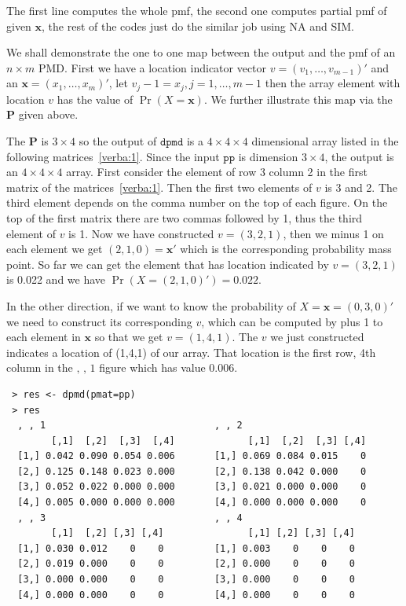 \documentclass[12pt]{article}
\newcommand{\Pmat}{\mathbf{P}}
\newcommand{\PMD}{\textrm{PMD}}
\newcommand{\xvec}{\boldsymbol{x}}
\newcommand{\code}{\texttt}
\newcommand{\SIM}{{\textrm{SIM}}}
\newcommand{\NA}{{\textrm{NA}}}
\begin{document}
The first line computes the whole pmf, the second one computes partial pmf of given $\xvec$, the rest of the codes just do the similar job using $\NA$ and $\SIM$.

We shall demonstrate the one to one map between the output and the pmf of an $n \times m$ $\PMD$. First we have a location indicator vector $v = (v_1, \dots, v_{m-1})'$ and an $\xvec=(x_1,\dots,x_m)'$, let $v_j-1 = x_j, j =1,\dots,m-1$ then the array element with location $v$ has the value of $\Pr(X=\xvec)$. We further illustrate this map via the $\Pmat$ given above.

The $\Pmat$ is $3 \times 4$ so the output of $\code{dpmd}$ is a $4 \times 4 \times 4$ dimensional array listed in the following matrices~\ref{verba:1}. Since the input $\code{pp}$ is dimension $3 \times 4$, the output is an $4 \times 4 \times 4$ array. First consider the element of row 3 column 2 in the first matrix of the matrices~\ref{verba:1}. Then the first two elements of $v$ is 3 and 2. The third element depends on the comma number on the top of each figure. On the top of the first matrix there are two commas followed by 1, thus the third element of $v$ is 1. Now we have constructed $v = (3,2,1)$, then we minus 1 on each element we get $(2,1,0)=\xvec'$ which is the corresponding probability mass point. So far we can get the element that has location indicated by $v=(3,2,1)$ is 0.022 and we have $\Pr(X=(2,1,0)')=0.022$. 

In the other direction, if we want to know the probability of $X=\xvec=(0,3,0)'$ we need to construct its corresponding $v$, which can be computed by plus 1 to each element in $\xvec$ so that we get $v=(1,4,1)$. The $v$ we just constructed indicates a location of (1,4,1) of our array. That location is the first row, 4th column in the $\text{, , 1}$ figure which has value 0.006.

\begin{verbatim}
 > res <- dpmd(pmat=pp)
 > res
  , , 1                              , , 2
        [,1]  [,2]  [,3]  [,4]             [,1]  [,2]  [,3] [,4] 
  [1,] 0.042 0.090 0.054 0.006       [1,] 0.069 0.084 0.015    0 
  [2,] 0.125 0.148 0.023 0.000       [2,] 0.138 0.042 0.000    0 
  [3,] 0.052 0.022 0.000 0.000       [3,] 0.021 0.000 0.000    0 
  [4,] 0.005 0.000 0.000 0.000       [4,] 0.000 0.000 0.000    0 
  , , 3                              , , 4                     
        [,1]  [,2] [,3] [,4]               [,1] [,2] [,3] [,4]
  [1,] 0.030 0.012    0    0         [1,] 0.003    0    0    0 
  [2,] 0.019 0.000    0    0         [2,] 0.000    0    0    0 
  [3,] 0.000 0.000    0    0         [3,] 0.000    0    0    0 
  [4,] 0.000 0.000    0    0         [4,] 0.000    0    0    0 
\end{verbatim}
\label{verba:1}
\end{document}
